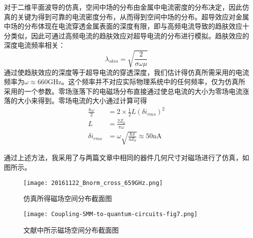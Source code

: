         对于二维平面波导的仿真，空间中场的分布由金属中电流密度的分布决定，因此仿真的关键为得到可靠的电流密度分布，从而得到空间中场的分布。超导效应对金属中场的分布体现在电流穿透金属表面的深度有限，即与高频电流导致的趋肤效应十分类似，因此可通过高频电流的趋肤效应对超导电流的分布进行模拟\cite{Mark2013}。趋肤效应的深度电流频率相关：
        \begin{equation}
            \lambda_{skin} = \sqrt{\frac{2}{\sigma \omega \mu}}
        \end{equation}
        通过使趋肤效应的深度等于超导电流的穿透深度，我们估计得仿真所需采用的电流频率为$ \omega \approx 660 $GHz。这个频率并不对应实际物理系统中的任何频率，仅为仿真所采用的一个参数。零场涨落下的电磁场分布直接通过使总电流的大小为零场电流涨落的大小来得到。零场电流的大小通过计算可得\cite{PhysRevA.95.022306,Mark2013,Tosi2014}
        \begin{align}
            \label{eqn:ZPF_estimation}
            \frac{\hbar \omega }{2} &= 2\times \frac{1}{2}L (\delta i_{rms})^2\\
            L&= \frac{2Z_0}{\pi \omega}\\
            \delta i_{rms } &= \omega \sqrt{ \frac{\hbar \pi}{4Z_0} }\approx 50 \mathrm{nA}
        \end{align}
        
        通过上述方法，我采用了与两篇文章中相同的器件几何尺寸对磁场进行了仿真，如图所示。


        \begin{figure}
            \begin{minipage}[b]{0.4\textwidth}
                \centering
                \texttt{[image: 20161122\_Bnorm\_cross\_659GHz.png]}
                \caption{仿真所得磁场空间分布截面图}
                \label{fig:20161122_Bnorm_cross_659GHz}
            \end{minipage}%
            \hspace*{\fill}
            \begin{minipage}[b]{0.5\textwidth}
                \centering
                \texttt{[image: Coupling-SMM-to-quantum-circuits-fig7.png]}
                \caption{文献\cite{Mark2013}中所示磁场空间分布截面图}
                \label{fig:Coupling-SMM-to-quantum-circuits-fig7}
            \end{minipage}
        \end{figure}
        
